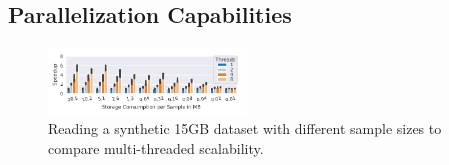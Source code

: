 {\color{diff}

\subsection{Parallelization Capabilities}
\label{ssec:parallelization-capabilities}

\vspace{-0.45cm}
\begin{figure}[h]
    \centering
    \includegraphics[width=0.47\textwidth]{figures/misc/artificial-dataset-float-multithreaded}
    \vspace{-15pt}
    \caption{{\color{diff}Reading a synthetic 15\:GB dataset with different sample sizes to compare multi-threaded scalability.}}
    \label{fig:synthetic-dataset-speedup}
\end{figure}
\vspace{-0.2cm}


}
